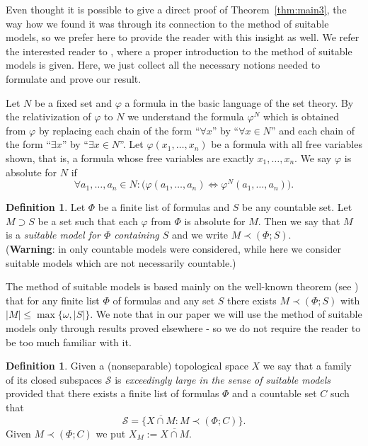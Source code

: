 \documentclass[11pt]{amsart}
\theoremstyle{definition}
\newtheorem{defin}[thm]{Definition}
\theoremstyle{remark}
\newcommand{\SSS}{\mathcal S}
\begin{document}
Even thought it is possible to give a direct proof of Theorem~\ref{thm:main3}, the way how we found it was through its connection to the method of suitable models, so we prefer here to provide the reader with this insight as well. We refer the interested reader to \cite[Section 2]{C18}, where a proper introduction to the method of suitable models is given. Here, we just collect all the necessary notions needed to formulate and prove our result.

 Let $N$ be a fixed set and $\varphi$ a formula in the basic language of the set theory. By the relativization of $\varphi$ to $N$ we understand the formula $\varphi^N$ which is
obtained from $\varphi$ by replacing each chain of the form ``$\forall x$'' by ``$\forall x\in N$'' and each chain of the form ``$\exists x$'' by ``$\exists x\in N$''. Let $\varphi(x_1,\ldots,x_n)$ be a formula with all free variables shown, that is, a formula
whose free variables are exactly $x_1,\ldots,x_n$. We say $\varphi$ is absolute for $N$ if
\[
\forall a_1,\ldots,a_n\in N: \big(\varphi(a_1,\ldots,a_n) \Leftrightarrow \varphi^N(a_1,\ldots,a_n)\big).
\]
\begin{defin}
Let $\Phi$ be a finite list of formulas and $S$ be any countable set. Let $M\supset S$ be a set such that each $\varphi$ from $\Phi$ is absolute for $M$. Then we say that $M$ is a \emph{suitable model for $\Phi$ containing $S$} and we write $M \prec (\Phi; S)$.\\
(\textbf{Warning}: in \cite{C18} only countable models were considered, while here we consider suitable models which are not necessarily countable.)
\end{defin}
The method of suitable models is based mainly on the well-known theorem (see \cite[Chapter IV,
Theorem 7.]{kunenBook}) that for any finite list $\Phi$ of formulas and any set $S$ there exists $M\prec (\Phi;S)$ with $|M|\leq \max\{\omega,|S|\}$. We note that in our paper we will use the method of suitable models only through results proved elsewhere - so we do not require the reader to be too much familiar with it.

\begin{defin}
Given a (nonseparable) topological space $X$ we say that a family of its closed subspaces $\SSS$ is \emph{exceedingly large in the sense of suitable models} provided that there exists a finite list of formulas $\Phi$ and a countable set $C$ such that
\[
\SSS = \{\overline{X\cap M}\colon M\prec(\Phi;C)\}.
\]
Given $M\prec (\Phi;C)$ we put $X_M:=\overline{X\cap M}$.
\end{defin}
\end{document}
